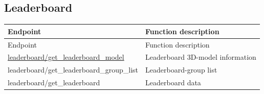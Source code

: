 \subsection{Leaderboard}

\begin{longtable}{>{\ttfamily}p{}p{}}
\toprule
Endpoint & Function description \\
\midrule
\endfirsthead%

\toprule
Endpoint & Function description \\
\midrule
\endhead%

\hyperref[subsec:api_leaderboard_get_leaderboard_model]
    {leaderboard/get\_leaderboard\_model}
    & Leaderboard 3D-model information \\

leaderboard/get\_leaderboard\_group\_list
    & Leaderboard-group list \\

leaderboard/get\_leaderboard
    & Leaderboard data \\

\bottomrule
\end{longtable}